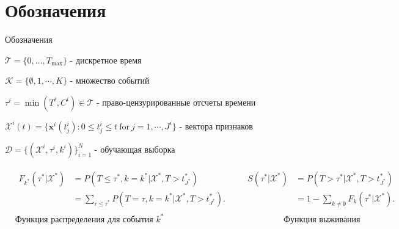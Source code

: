 \documentclass[10pt,pdf,hyperref={unicode}]{beamer}
\begin{document}
\section{Обозначения}
\begin{frame}{Обозначения}


$\mathcal{T}=\{0,\ldots,T_{\max}\}$ - дискретное время

$\mathcal{K}=\{\emptyset,1,\cdots,K\}$ - множество событий

$\tau^i=\min(T^i,C^i) \in\mathcal{T} $ - право-цензурированные отсчеты времени

$\mathcal{X}^i(t)=\{\mathbf{x}^i(t_j^i):0\leq t_j^i\leq t\mathrm{~for~}j=1,\cdots,J^i\}$ - вектора признаков 

$\mathcal{D}=\{(\mathcal{X}^i,\tau^{i},k^{i})\}_{i=1}^{N}$ - обучающая выборка



{\fontsize{8.5}{10}\selectfont
	\begin{align*}
		& \begin{aligned}
			F_{k^{*}}(\tau^{*}|\mathcal{X}^{*}) & = P(T\leq\tau^{*},k=k^{*}|\mathcal{X}^{*},T>t_{J^{*}}^{*}) \\
			& =\sum_{\tau\leq\tau^*}P(T=\tau,k=k^*|\mathcal{X}^*,T>t_{J^*}^*).
		\end{aligned}
		\quad
		& \begin{aligned}
			S(\tau^{*}|\mathcal{X}^{*}) & = P(T>\tau^*|\mathcal{X}^{*},T>t_{J^*}^{*}) \\
			& =1-\sum_{k\neq\emptyset}F_k(\tau^*|\mathcal{X}^{*}).
		\end{aligned} \\
		& \text{Функция распределения для события $k^*$}
		& \hspace{55pt} \text{Функция выживания}
	\end{align*}
}



\end{frame}


\end{document}
